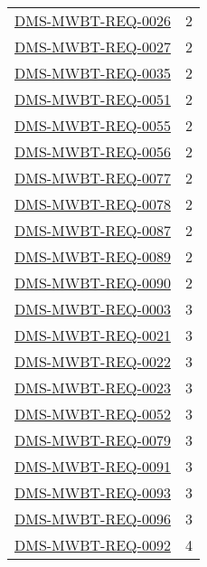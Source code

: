 \begin{small}
\begin{longtable}[]{|l|l|}
\hyperref[DMS-MWBT-REQ-0026]{DMS-MWBT-REQ-0026} & 2 \\
\hyperref[DMS-MWBT-REQ-0027]{DMS-MWBT-REQ-0027} & 2 \\
\hyperref[DMS-MWBT-REQ-0035]{DMS-MWBT-REQ-0035} & 2 \\
\hyperref[DMS-MWBT-REQ-0051]{DMS-MWBT-REQ-0051} & 2 \\
\hyperref[DMS-MWBT-REQ-0055]{DMS-MWBT-REQ-0055} & 2 \\
\hyperref[DMS-MWBT-REQ-0056]{DMS-MWBT-REQ-0056} & 2 \\
\hyperref[DMS-MWBT-REQ-0077]{DMS-MWBT-REQ-0077} & 2 \\
\hyperref[DMS-MWBT-REQ-0078]{DMS-MWBT-REQ-0078} & 2 \\
\hyperref[DMS-MWBT-REQ-0087]{DMS-MWBT-REQ-0087} & 2 \\
\hyperref[DMS-MWBT-REQ-0089]{DMS-MWBT-REQ-0089} & 2 \\
\hyperref[DMS-MWBT-REQ-0090]{DMS-MWBT-REQ-0090} & 2 \\
\hyperref[DMS-MWBT-REQ-0003]{DMS-MWBT-REQ-0003} & 3 \\
\hyperref[DMS-MWBT-REQ-0021]{DMS-MWBT-REQ-0021} & 3 \\
\hyperref[DMS-MWBT-REQ-0022]{DMS-MWBT-REQ-0022} & 3 \\
\hyperref[DMS-MWBT-REQ-0023]{DMS-MWBT-REQ-0023} & 3 \\
\hyperref[DMS-MWBT-REQ-0052]{DMS-MWBT-REQ-0052} & 3 \\
\hyperref[DMS-MWBT-REQ-0079]{DMS-MWBT-REQ-0079} & 3 \\
\hyperref[DMS-MWBT-REQ-0091]{DMS-MWBT-REQ-0091} & 3 \\
\hyperref[DMS-MWBT-REQ-0093]{DMS-MWBT-REQ-0093} & 3 \\
\hyperref[DMS-MWBT-REQ-0096]{DMS-MWBT-REQ-0096} & 3 \\
\hyperref[DMS-MWBT-REQ-0092]{DMS-MWBT-REQ-0092} & 4 \\

\hline
\end{longtable}
\end{small}
